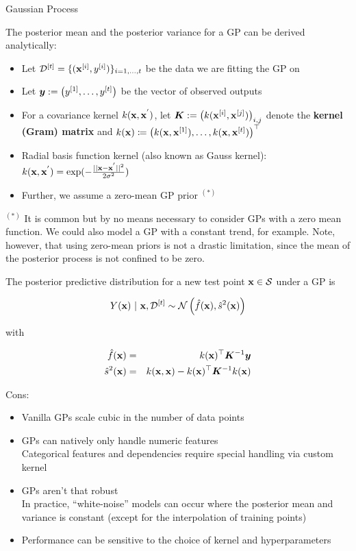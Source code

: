 \documentclass[11pt,compress,t,notes=noshow, xcolor=table]{beamer}
\begin{document}
\begin{vbframe}{Gaussian Process}
\framebreak

The posterior mean and the posterior variance for a GP can be derived analytically: 

\begin{itemize}
  \item Let $\mathcal{D}^{[t]} = \{(\mathbf{x}^{[i]}, y^{[i]})\}_{i = 1, \ldots, t}$ be the data we are fitting the GP on
  \item Let $\bm{y}:= \left(y^{[1]}, \ldots, y^{[t]}\right)$ be the vector of observed outputs
  \item For a covariance kernel $k(\mathbf{x}, \mathbf{x}^{'})$, let $\bm{K} := \left(k(\mathbf{x}^{[i]}, \mathbf{x}^{[j]})\right)_{i,j}$ denote the \textbf{kernel (Gram) matrix} and $k(\mathbf{x}) \coloneqq \left(k(\mathbf{x}, \mathbf{x}^{[1]}), \ldots, k(\mathbf{x}, \mathbf{x}^{[t]})\right)^\top$
  \item Radial basis function kernel (also known as Gauss kernel): $k(\mathbf{x}, \mathbf{x}^{'})=\exp (-\frac{||\mathbf{x} - \mathbf{x}^{'}||^2}{2 \sigma^2})$
  \item Further, we assume a zero-mean GP prior $^{(*)}$  
\end{itemize}

\vfill

\begin{footnotesize}
 $^{(*)}$ It is common but by no means necessary to consider GPs with a zero mean function. We could also model a GP with a constant trend, for example. Note, however, that using zero-mean priors is not a drastic limitation, since the mean of the posterior process is not confined to be zero. 
\end{footnotesize}

\framebreak 

The posterior predictive distribution for a new test point $\mathbf{x} \in \mathcal{S}$ under a GP is

\begin{eqnarray*}
  Y(\mathbf{x}) ~|~ \mathbf{x}, \mathcal{D}^{[t]} \sim \mathcal{N}\left(\hat{f}(\mathbf{x}), \hat{s}^2(\mathbf{x})\right)
\end{eqnarray*}

with 

\begin{eqnarray*}
  \hat{f}(\mathbf{x}) &=& k(\mathbf{x})^\top \bm{K}^{-1} \bm{y} \\
  \hat{s}^2(\mathbf{x}) &=& k(\mathbf{x}, \mathbf{x}) - k(\mathbf{x})^\top \bm{K}^{-1} k(\mathbf{x})
\end{eqnarray*}

\vfill

\framebreak

Cons:
\begin{itemize}
  \item Vanilla GPs scale cubic in the number of data points
  \item GPs can natively only handle numeric features\\
    Categorical features and dependencies require special handling via custom kernel
  \item GPs aren't that robust\\
    In practice, \enquote{white-noise} models can occur where the posterior mean and variance is constant (except for the interpolation of training points)
  \item Performance can be sensitive to the choice of kernel and hyperparameters
\end{itemize}


\end{vbframe}
\end{document}
